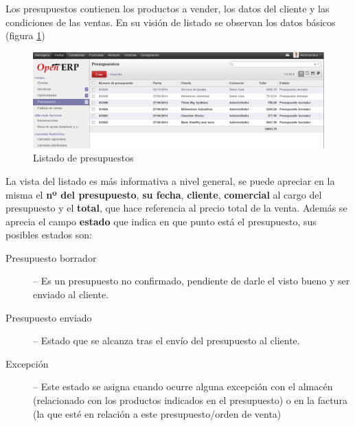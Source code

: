 Los presupuestos contienen los productos a vender, los datos del cliente y las condiciones de las ventas. En su visión de listado se observan los datos básicos (figura \ref{ven:prelista})
\begin{figure}[H]
\includegraphics[width=\textwidth]{ventas/img/ven_prelista.png}
\caption{Listado de presupuestos}
\label{ven:prelista}
\end{figure}

La vista del listado es más informativa a nivel general, se puede apreciar en la misma el \textbf{nº del presupuesto}, \textbf{su fecha}, 
\textbf{cliente}, \textbf{comercial} al cargo del presupuesto y el \textbf{total}, que hace referencia al precio total de la venta. Además se aprecia el campo \textbf{estado} que indica en que punto está el presupuesto, sus posibles estados son:

\begin{description}
  \item[Presupuesto borrador] -- Es un presupuesto no confirmado, pendiente de darle el visto bueno y ser enviado al cliente.
  \item[Presupuesto enviado] -- Estado que se alcanza tras el envío del presupuesto al cliente.
  \item[Excepción] -- Este estado se asigna cuando ocurre alguna excepción con el almacén (relacionado con los productos indicados en el
                      presupuesto) o en la factura (la que esté en relación a este presupuesto/orden de venta)
\end{description}
\vspace{1cm}


